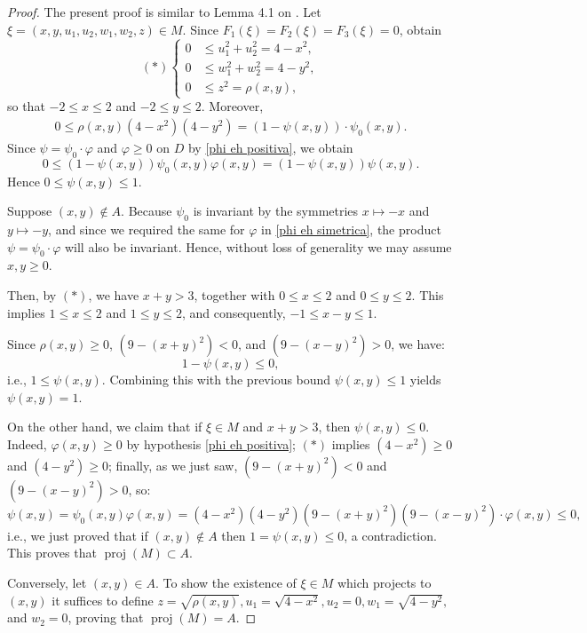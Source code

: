 \documentclass[11pt,reqno]{amsart}
\theoremstyle{plain}
\theoremstyle{definition}
\theoremstyle{remark}
\theoremstyle{plain}
\numberwithin{equation}{section}
\newcommand{\proj}{\operatorname{proj}}
\begin{document}
							\begin{proof}
								The present proof is similar to Lemma 4.1 on \cite{EV78}. Let $\xi=(x,y,u_{1},u_{2},w_{1},w_{2},z)\in M$. Since $F_{1}(\xi)=F_{2}(\xi)=F_{3}(\xi)=0$, obtain $$(\ast)\begin{cases}
									0&\leq u_{1}^{2}+u_{2}^{2}=4-x^{2},\\
									0&\leq w_{1}^{2}+w_{2}^{2}=4-y^{2},\\
									0&\leq z^{2}=\rho(x,y),
								\end{cases}$$ so that $-2\leq x\leq 2$ and $-2\leq y\leq 2$. Moreover, \begin{align*}
									0\leq \rho(x,y)(4-x^{2})(4-y^{2})=(1-\psi(x,y))\cdot \psi_{0}(x,y).
								\end{align*} Since \(\psi=\psi_0\cdot \varphi\) and \(\varphi\ge0\) on \(D\) by  \ref{phi eh positiva}, we obtain
								\[
								0\le (1-\psi(x,y))\psi_0(x,y)\varphi(x,y)=(1-\psi(x,y))\psi(x,y).
								\] Hence $0\leq \psi(x,y)\leq 1$.
								
								
								Suppose $(x,y)\notin A$. Because $\psi_{0}$ is invariant by the symmetries $x\mapsto -x$ and $y\mapsto -y$, and since we required the same for $\varphi$ in \ref{phi eh simetrica}, the product \(\psi=\psi_0\cdot \varphi\) will also be invariant. Hence, without loss of generality we may assume \(x,y\ge0\).
								
								Then, by $(\ast)$, we have $x+y>3$, together with $0\leq x\leq 2$ and $0\leq y\leq 2$. This implies $1\leq x\leq 2$ and $1\leq y\leq 2$, and consequently, $-1\leq x-y\leq 1$.
								
								Since $\rho(x,y)\geq 0$, $(9-(x+y)^{2})<0$, and $(9-(x-y)^{2})>0$, we have: 
								$$1-\psi(x,y)\leq 0,$$ i.e., $1\leq \psi(x,y)$. Combining this with the previous bound \(\psi(x,y)\le1\) yields \(\psi(x,y)=1\).
								
								On the other hand, we claim that if $\xi\in M$ and $x+y>3$, then $\psi(x,y)\leq 0$. Indeed, $\varphi(x,y)\geq 0$ by hypothesis \ref{phi eh positiva}; $(\ast)$ implies $(4-x^{2})\geq 0$ and $(4-y^{2})\geq 0$; finally, as we just saw, $(9-(x+y)^{2})<0$ and $(9-(x-y)^{2})>0$, so: $$\psi(x,y)=\psi_{0}(x,y)\varphi(x,y)=(4-x^{2})(4-y^{2})(9-(x+y)^{2})(9-(x-y)^{2})\cdot \varphi(x,y)\leq 0,$$ i.e., we just proved that if $(x,y)\notin A$ then $1= \psi(x,y)\leq 0$, a contradiction. This proves that $\proj(M)\subset A$.
								
								Conversely, let $(x,y)\in A$. To show the existence of $\xi\in M$ which projects to $(x,y)$ it suffices to define $z=\sqrt{\rho(x,y)}, u_{1}=\sqrt{4-x^{2}},u_{2}=0,w_{1}=\sqrt{4-y^{2}},$ and $w_{2}=0$, proving that $\proj(M)=A$.
							\end{proof}
							
\end{document}
